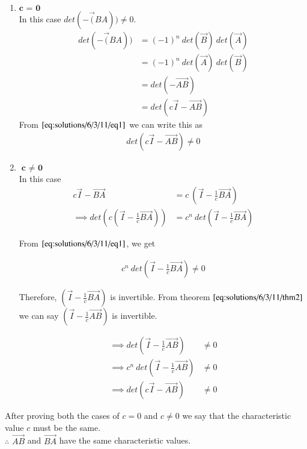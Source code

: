 	\begin{enumerate}
		\item $\textbf{c = 0}$ \\
		In this case $det(- \vec(BA)) \neq 0$. 	
		\begin{align}
			det(- \vec(BA)) &= (-1)^{n} \ det(\vec{B}) \ det(\vec{A}) \nonumber\\ 
			&= (-1)^{n} \ det(\vec{A}) \ det(\vec{B}) \nonumber\\ 
			&= det(- \vec{AB}) \nonumber\\
			&= det(c\vec{I} - \vec{AB}) \nonumber
		\end{align}
		From $\eqref{eq:solutions/6/3/11/eq1}$ we can write this as
		\begin{align}
			det(c\vec{I}-\vec{AB}) \neq 0
		\end{align}
		
		
		\item $\textbf{c $\neq$ 0}$ \\
		In this case 
		\begin{align}
			c\vec{I} - \vec{BA} &= c \ \left(\vec{I} - \frac{1}{c}\vec{BA}\right) \nonumber\\
			\implies det\left(c\left(\vec{I} - \frac{1}{c}\vec{BA}\right)\right) &= c^{n} \ det\left(\vec{I}-\frac{1}{c}\vec{BA}\right) \nonumber
		\end{align}	
		
		From $\eqref{eq:solutions/6/3/11/eq1}$, we get
		
		\begin{align}
			c^{n} \ det\left(\vec{I}-\frac{1}{c}\vec{BA}\right) \neq 0  \nonumber
		\end{align}
		
		Therefore, $\left(\vec{I} - \frac{1}{c}\vec{BA}\right)$ is invertible. From theorem $\ref{eq:solutions/6/3/11/thm2}$ we can say $\left(\vec{I} - \frac{1}{c}\vec{AB}\right)$ is invertible. 
		
		\begin{align}
			\implies det\left(\vec{I} - \frac{1}{c}\vec{AB}\right) &\neq 0 \nonumber\\
			\implies c^{n} \ det\left(\vec{I} - \frac{1}{c}\vec{AB}\right) &\neq 0 \nonumber\\
			\implies det\left(c\vec{I} - \vec{AB}\right) &\neq 0
		\end{align}
		
		
		
	\end{enumerate}
	
	After proving both the cases of $c = 0$ and $c \neq 0$ we say that the characteristic value $c$ must be the same.\\$\therefore$ $\vec{AB}$ and $\vec{BA}$ have the same characteristic values. \\
	
